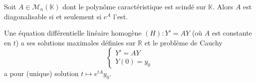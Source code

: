   \begin{application}
    Soit $A \in \mathcal{M}_n(\mathbb{K})$ dont le polynôme caractéristique est scindé sur $\mathbb{K}$. Alors $A$ est diagonalisable si et seulement si $e^A$ l'est.
  \end{application}


  \begin{application}
    Une équation différentielle linéaire homogène $(H) : Y' = AY$ (où $A$ est constante en $t$) a ses solutions maximales définies sur $\mathbb{R}$ et le problème de Cauchy
    \[ \begin{cases} Y' = AY \\ Y(0) = y_0 \end{cases} \]
    a pour (unique) solution $t \mapsto e^{tA} y_0$.
  \end{application}

